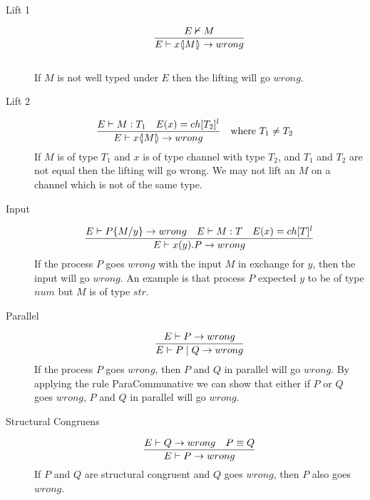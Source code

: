 \begin{description}
    \item[Lift 1] \begin{align*}
        \frac{E \nvdash M}{E \vdash x \langle \! | M | \! \rangle \rightarrow wrong}
    \end{align*}\\
    If $M$ is not well typed under $E$ then the lifting will go $wrong$.\\
        
    \item[Lift 2] \begin{align*}
            \frac{E \vdash M:T_1 \quad E(x)=ch[T_2]^l}{E \vdash x \langle \! | M | \! \rangle \rightarrow wrong} &\quad \text{where}\ T_1 \neq T_2
    \end{align*}
    If $M$ is of type $T_1$ and $x$ is of type channel with type $T_2$, and $T_1$ and $T_2$ are not equal then the lifting will go wrong. We may not lift an $M$ on a channel which is not of the same type.\\

    \item[Input] \begin{align*}
        \frac{E \vdash P\{ M/ y\} \rightarrow wrong \quad E \vdash M:T \quad E(x)= ch[T]^l} {E \vdash x(y).P \rightarrow wrong}\\
    \end{align*}
    If the process $P$ goes $wrong$ with the input $M$ in exchange for $y$, then the input will go $wrong$. An example is that process $P$ expected $y$ to be of type $num$ but $M$ is of type $str$.\\

    \item[Parallel] \begin{align*}
        \frac{E \vdash P \rightarrow wrong}{E \vdash P \mid Q \rightarrow wrong}
    \end{align*}
    If the process $P$ goes $wrong$, then $P$ and $Q$ in parallel will go $wrong$. By applying the rule ParaCommunative we can show that either if $P$ or $Q$ goes $wrong$, $P$ and $Q$ in parallel will go $wrong$.\\

    \item[Structural Congruens] \begin{align*}
        \frac{E \vdash Q \rightarrow wrong \quad P \equiv Q}{E \vdash P \rightarrow wrong}
    \end{align*}
    If $P$ and $Q$ are structural congruent and $Q$ goes $wrong$, then $P$ also goes $wrong$.\\


\end{description}
